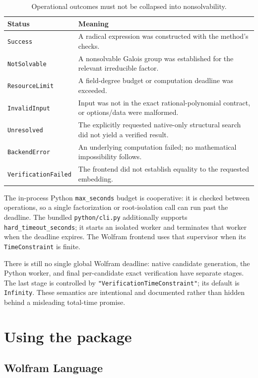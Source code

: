 \documentclass[11pt]{article}
\theoremstyle{definition}\newtheorem{definition}[theorem]{Definition}
\theoremstyle{remark}\newtheorem{remark}[theorem]{Remark}
\newcommand{\code}[1]{\texttt{#1}}
\begin{document}
\begin{table}[ht]
\centering\small
\begin{tabularx}{\linewidth}{@{}lX@{}}
\toprule
Status & Meaning \\
\midrule
\code{Success} & A radical expression was constructed with the method's checks. \\
\code{NotSolvable} & A nonsolvable Galois group was established for the relevant irreducible factor. \\
\code{ResourceLimit} & A field-degree budget or computation deadline was exceeded. \\
\code{InvalidInput} & Input was not in the exact rational-polynomial contract, or options/data were malformed. \\
\code{Unresolved} & The explicitly requested native-only structural search did not yield a verified result. \\
\code{BackendError} & An underlying computation failed; no mathematical impossibility follows. \\
\code{VerificationFailed} & The frontend did not establish equality to the requested embedding. \\
\bottomrule
\end{tabularx}
\caption{Operational outcomes must not be collapsed into nonsolvability.}\label{tab:status}
\end{table}

The in-process Python \code{max\_seconds} budget is cooperative: it is checked
between operations, so a single factorization or root-isolation call can run
past the deadline. The bundled \code{python/cli.py} additionally supports
\code{hard\_timeout\_seconds}; it starts an isolated worker and terminates that
worker when the deadline expires. The Wolfram frontend uses that supervisor
when its \code{TimeConstraint} is finite.

There is still no single global Wolfram deadline: native candidate generation,
the Python worker, and final per-candidate exact verification have separate
stages. The last stage is controlled by
\code{"VerificationTimeConstraint"}; its default is \code{Infinity}. These semantics are intentional and documented rather than
hidden behind a misleading total-time promise.

\section{Using the package}\label{sec:usage}

\subsection{Wolfram Language}
\end{document}
